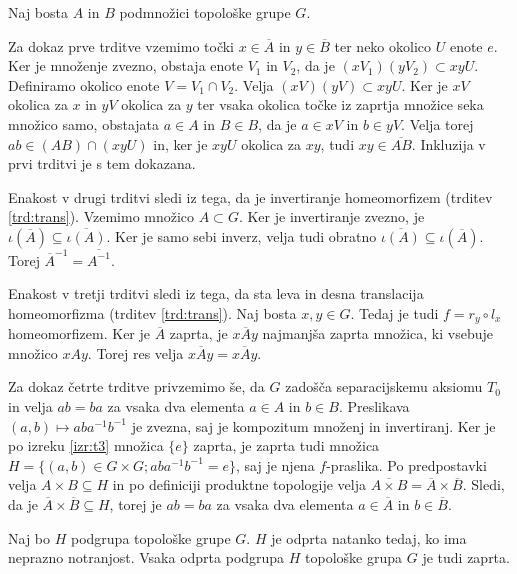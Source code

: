 \documentclass[mat1]{fmfdelo}
\newcommand{\closure}[1]{\overline{#1}}
\begin{document}
\begin{dokaz}
Naj bosta $A$ in $B$ podmnožici topološke grupe $G$.

Za dokaz prve trditve vzemimo točki $x \in \closure{A}$ in $y \in \closure{B}$ ter neko okolico $U$ enote $e$. Ker je množenje zvezno, obstaja enote $V_1$ in $V_2$, da je $(xV_1)(yV_2) \subset xyU$. Definiramo okolico enote $V = V_1 \cap V_2$. Velja $(xV)(yV) \subset xyU$. Ker je $xV$ okolica za $x$ in $yV$ okolica za $y$ ter vsaka okolica točke iz zaprtja množice seka množico samo, obstajata $a \in A$ in $B \in B$, da je $a \in xV$ in $b \in yV$. Velja torej $ab \in (AB) \cap (xyU)$ in, ker je $xyU$ okolica za $xy$, tudi $xy \in \closure{AB}$. Inkluzija v prvi trditvi je s tem dokazana.

Enakost v drugi trditvi sledi iz tega, da je invertiranje homeomorfizem (trditev \ref{trd:trans}). Vzemimo množico $A \subset G$. Ker je invertiranje zvezno, je $\iota(\closure{A}) \subseteq \closure{\iota(A)}$. Ker je samo sebi inverz, velja tudi obratno $\closure{\iota(A)} \subseteq \iota(\closure{A})$. Torej $\closure{A}^{-1} = \closure{A^{-1}}$.

Enakost v tretji trditvi sledi iz tega, da sta leva in desna translacija homeomorfizma (trditev \ref{trd:trans}). Naj bosta $x, y \in G$. Tedaj je tudi $f = r_y \circ l_x$ homeomorfizem. Ker je $\closure{A}$ zaprta, je $x\closure{A}y$ najmanjša zaprta množica, ki vsebuje množico $xAy$. Torej res velja $x\closure{A}y = \closure{xAy}$.

Za dokaz četrte trditve privzemimo še, da $G$ zadošča separacijskemu aksiomu $T_0$ in velja $ab = ba$ za vsaka dva elementa $a \in A$ in $b \in B$. Preslikava $(a,b) \mapsto aba^{-1}b^{-1}$ je zvezna, saj je kompozitum množenj in invertiranj. Ker je po izreku \ref{izr:t3} množica $\lbrace e \rbrace$ zaprta, je zaprta tudi množica $H = \lbrace (a, b) \in G \times G; aba^{-1}b^{-1} = e \rbrace$, saj je njena $f$-praslika. Po predpostavki velja $A \times B \subseteq H$ in po definiciji produktne topologije velja $\closure{A \times B} = \closure{A} \times \closure{B}$. Sledi, da je $\closure{A} \times \closure{B} \subseteq H$, torej je $ab = ba$ za vsaka dva elementa $a \in \closure{A}$ in $b \in \closure{B}$.
\end{dokaz}

\begin{trditev}\label{trd:odpzap}
Naj bo $H$ podgrupa topološke grupe $G$. $H$ je odprta natanko tedaj, ko ima neprazno notranjost. Vsaka odprta podgrupa $H$ topološke grupa $G$ je tudi zaprta.
\end{trditev}
\end{document}
